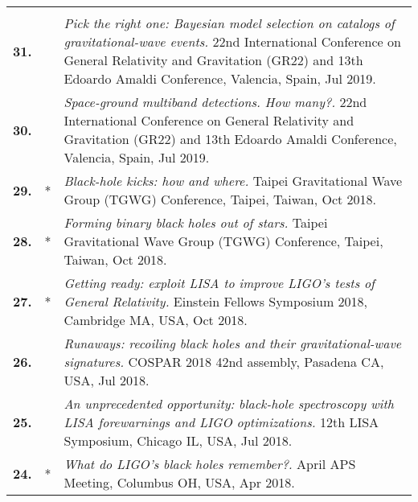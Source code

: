 {\begin{longtable}{rp{0.3cm}p{15.8cm}}
\vspace{0.05cm}\\
%
\textbf{31.} &  & \textit{Pick the right one: Bayesian model selection on catalogs of gravitational-wave events.}
\newline{}
 22nd International Conference on General Relativity and Gravitation (GR22) and 13th Edoardo Amaldi Conference, Valencia, Spain, Jul 2019.
\vspace{0.05cm}\\
%
\textbf{30.} &  & \textit{Space-ground multiband detections. How many?.}
\newline{}
 22nd International Conference on General Relativity and Gravitation (GR22) and 13th Edoardo Amaldi Conference, Valencia, Spain, Jul 2019.
\vspace{0.05cm}\\
%
\textbf{29.} & * & \textit{Black-hole kicks: how and where.}
\newline{}
 Taipei Gravitational Wave Group (TGWG) Conference, Taipei, Taiwan, Oct 2018.
\vspace{0.05cm}\\
%
\textbf{28.} & * & \textit{Forming binary black holes out of stars.}
\newline{}
 Taipei Gravitational Wave Group (TGWG) Conference, Taipei, Taiwan, Oct 2018.
\vspace{0.05cm}\\
%
\textbf{27.} & * & \textit{Getting ready: exploit LISA to improve LIGO's tests of General Relativity.}
\newline{}
 Einstein Fellows Symposium 2018, Cambridge MA, USA, Oct 2018.
\vspace{0.05cm}\\
%
\textbf{26.} &  & \textit{Runaways: recoiling black holes and their gravitational-wave signatures.}
\newline{}
 COSPAR 2018 42nd assembly, Pasadena CA, USA, Jul 2018.
\vspace{0.05cm}\\
%
\textbf{25.} &  & \textit{An unprecedented opportunity: black-hole spectroscopy with LISA forewarnings and LIGO optimizations.}
\newline{}
 12th LISA Symposium, Chicago IL, USA, Jul 2018.
\vspace{0.05cm}\\
%
\textbf{24.} & * & \textit{What do LIGO's black holes remember?.}
\newline{}
 April APS Meeting, Columbus OH, USA, Apr 2018.
\vspace{0.05cm}\\

\end{longtable}}
